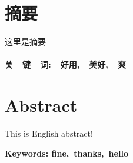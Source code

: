 \mylineskip

\chapter{摘要}
这里是摘要\\
\\
\bfseries 关\ \ 键\ \ 词:\ \ 好用,\ \ 美好,\ \ 爽 \mdseries
\chapter{Abstract}
This is English abstract!


\textbf{Keywords: fine,\ thanks,\ hello} %